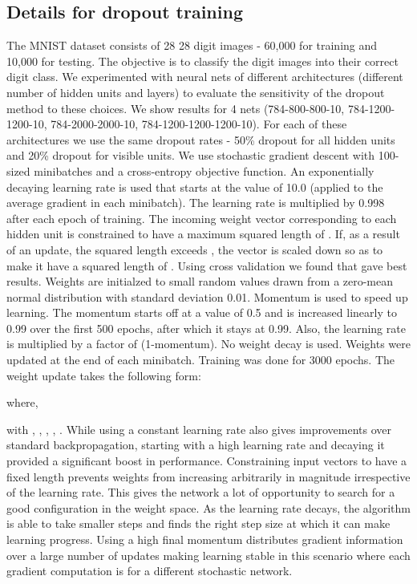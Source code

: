 \documentclass[12pt]{article}
\begin{document}
\subsection{Details for dropout training}
\label{sec:mnist_dropout_nopre}
The MNIST dataset consists of 28  28 digit images - 60,000 for training and 10,000 for testing.
The objective is to classify the digit images into their correct digit class.
We experimented with neural nets of different architectures (different number of hidden units and
layers) to evaluate the sensitivity of the dropout method to these choices. We show
results for 4 nets (784-800-800-10, 784-1200-1200-10, 784-2000-2000-10,
784-1200-1200-1200-10). For each of these architectures we use the same dropout
rates - 50\% dropout for all hidden units and 20\% dropout for visible units.
We use stochastic gradient descent with 100-sized minibatches and a cross-entropy objective function.
An exponentially decaying learning rate is used 
that starts at the value of 10.0 (applied to the average gradient in each
minibatch). The learning rate is multiplied by 0.998 after each epoch of
training. The incoming weight vector corresponding to each hidden unit is constrained to have a
maximum squared length of . If, as a result of an update, the squared length
exceeds , the vector is scaled down so as to make it have a squared length of
. Using cross validation we found that  gave best results.
Weights are initialzed to small random values drawn from a zero-mean normal distribution with
standard deviation 0.01. Momentum is used to speed up learning. The momentum
starts off at a value of 0.5 and is increased linearly to 0.99 over the first
500 epochs, after which it stays at 0.99. Also, the learning rate is multiplied
by a factor of (1-momentum). No weight decay is used.
Weights were updated at the end of each minibatch.
Training was done for 3000 epochs. 
The weight update takes the following form:

where,

with , , , , .
While using a constant learning rate also gives improvements over standard
backpropagation, starting with a high learning rate and decaying it provided a
significant boost in performance. Constraining input vectors to have a fixed
length prevents weights from increasing arbitrarily in magnitude
irrespective of the learning rate. This gives the network a lot of opportunity
to search for a good configuration in the weight space. As the learning rate
decays, the algorithm is able to take smaller steps and finds the right step size
at which it can make learning progress. Using a high final momentum distributes
gradient information over a large number of updates making learning
stable in this scenario where each gradient computation is for a different
stochastic network.
\end{document}
